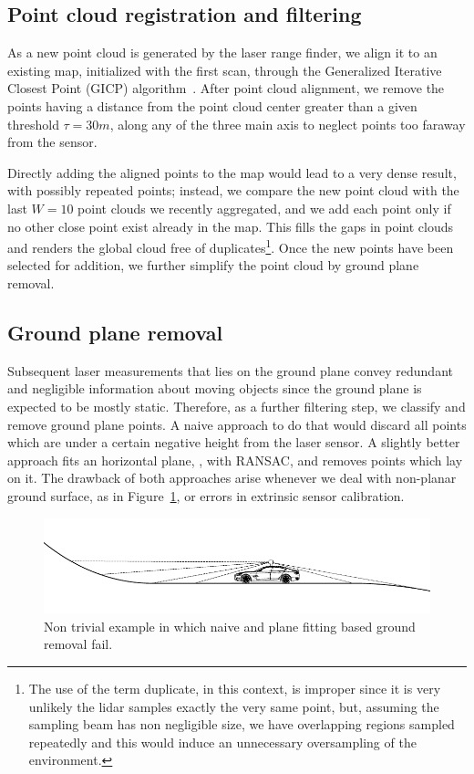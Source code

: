 \subsection{Point cloud registration and filtering}
As a new point cloud is generated by the laser range finder, we align it to an existing map, initialized with the first scan, through the Generalized Iterative Closest Point (GICP) algorithm~\cite{segal2009generalized}.
%
After point cloud alignment, we remove the points having a distance from the point cloud center greater than a given threshold $\tau = 30m$, along any of the three main axis to neglect points too faraway from the sensor.

Directly adding the aligned points to the map would lead to a very dense result, with possibly repeated points; instead, we compare the new point cloud with the last $W = 10$ 
point clouds we recently aggregated, and we add each point only if no other close point exist already in the map. This fills the gaps in point clouds and renders the global cloud free of duplicates\footnote{The use of the term duplicate, in this context, is improper since it is very unlikely the lidar samples exactly the very same point, but, assuming the sampling beam has non negligible size, we have overlapping regions sampled repeatedly and this would induce an unnecessary oversampling of the environment.}. Once the new points have been selected for addition, we further simplify the point cloud by ground plane removal.


\subsection{Ground plane removal}
\label{sec:ground_removal}
Subsequent laser measurements that lies on the ground plane convey redundant and negligible information about moving objects since the ground plane is expected to be mostly static. Therefore, as a further filtering step, we classify and remove ground plane points. 
A naive approach to do that would discard all points which are under a certain negative height from the laser sensor. 
A slightly better approach fits an horizontal plane, \eg, with RANSAC, and removes points which lay on it.
The drawback of both approaches arise whenever we deal with non-planar ground surface, as in Figure~\ref{fig:nonplane}, or errors in extrinsic sensor calibration.

\begin{figure}
\includegraphics[width=0.99\columnwidth]{./img/ch-laser/./non-plane}
\caption{Non trivial example in which naive and plane fitting based ground removal fail.}
\label{fig:nonplane}
\end{figure}

